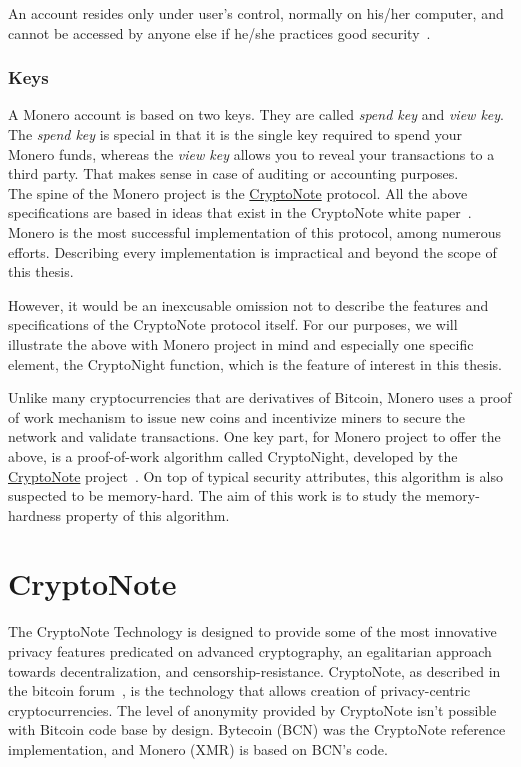 An account resides only under user's control, normally on his/her computer, and cannot be accessed by anyone else if he/she practices good security~\cite{getmonero}.

\subsubsection{Keys}
A Monero account is based on two keys. They are called \emph{spend key} and \emph{view key}. The \emph{spend key} is special in that it is the single key required to spend your Monero funds, whereas the \emph{view key} allows you to reveal your transactions to a third party. That makes sense in case of auditing or accounting purposes.\\

The spine of the Monero project is the \hyperref[sec:CryptoNote]{CryptoNote} protocol. All the above specifications are based in ideas that exist in the CryptoNote white paper~\cite{citeulike:14139412}. Monero is the most successful implementation of this protocol, among numerous efforts. Describing every implementation is impractical and beyond the scope of this thesis.

However, it would be an inexcusable omission not to describe the features and specifications of the CryptoNote protocol itself. For our purposes, we will illustrate the above with Monero project in mind and especially one specific element, the CryptoNight function, which is the feature of interest in this thesis.

Unlike many cryptocurrencies that are derivatives of Bitcoin, Monero uses a proof of work mechanism to issue new coins and incentivize miners to secure the network and validate transactions. One key part, for Monero project to offer the above, is a proof-of-work algorithm called CryptoNight, developed by the \hyperref[sec:CryptoNote]{CryptoNote} project~\cite{citeulike:14139412}. On top of typical security attributes, this algorithm is also suspected to be memory-hard. The aim of this work is to study the memory-hardness property of this algorithm.
%
\section{\label{sec:CryptoNote}CryptoNote}
The CryptoNote Technology is designed to provide some of the most innovative privacy features predicated on advanced cryptography, an egalitarian approach towards decentralization, and censorship-resistance. CryptoNote, as described in the bitcoin forum~\cite{btcforum}, is the technology that allows creation of privacy-centric cryptocurrencies. The level of anonymity provided by CryptoNote isn't possible with Bitcoin code base by design. Bytecoin (BCN) was the CryptoNote reference implementation, and Monero (XMR) is based on BCN's code.

